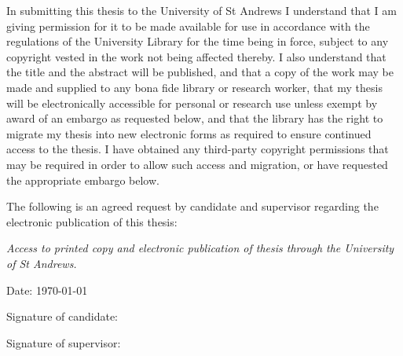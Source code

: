 %
%


\begin{permission}
In submitting this thesis to the University of St Andrews I understand that I am giving permission for it to be made available for use in accordance with the regulations of the University Library for the time being in force, subject to any copyright vested in the work not being affected thereby. I also understand that the title and the abstract will be published, and that a copy of the work may be made and supplied to any bona fide library or research worker, that my thesis will be electronically accessible for personal or research use unless exempt by award of an embargo as requested below, and that the library has the right to migrate my thesis into new electronic forms as required to ensure continued access to the thesis. I have obtained any third-party copyright permissions that may be required in order to allow such access and migration, or have requested the appropriate embargo below.

The following is an agreed request by candidate and supervisor regarding the electronic publication of this thesis:

\begin{indentpara}
\emph{Access to printed copy and electronic publication of thesis through the University of St Andrews.}
\end{indentpara}

\vspace{24pt}

Date: \today
\vspace{16pt}

Signature of candidate:
\vspace{48pt}

Signature of supervisor:
\end{permission}